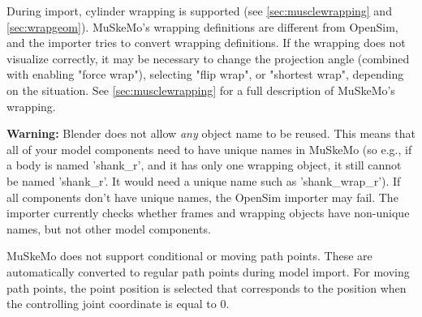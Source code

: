 \documentclass{article}
\begin{document}
During import, cylinder wrapping is supported (see \ref{sec:musclewrapping} and \ref{sec:wrapgeom}). MuSkeMo's wrapping definitions are different from OpenSim, and the importer tries to convert wrapping definitions. If the wrapping does not visualize correctly, it may be necessary to change the projection angle (combined with enabling "force wrap"), selecting "flip wrap", or "shortest wrap", depending on the situation. See \ref{sec:musclewrapping} for a full description of MuSkeMo's wrapping.

\textbf{Warning:} Blender does not allow \textit{any} object name to be reused. This means that all of your model components need to have unique names in MuSkeMo (so e.g., if a body is named 'shank\_r', and it has only one wrapping object, it still cannot be named 'shank\_r'. It would need a unique name such as 'shank\_wrap\_r'). If all components don't have unique names, the OpenSim importer may fail. The importer currently checks whether frames and wrapping objects have non-unique names, but not other model components.

MuSkeMo does not support conditional or moving path points. These are automatically converted to regular path points during model import. For moving path points, the point position is selected that corresponds to the position when the controlling joint coordinate is equal to 0.
\end{document}
